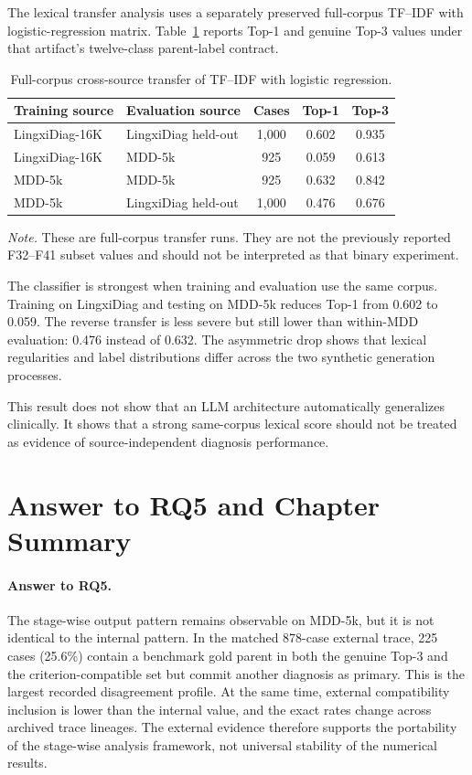The lexical transfer analysis uses a separately preserved full-corpus TF--IDF with logistic-regression matrix. Table~\ref{tab:lexical-transfer-rewrite} reports Top-1 and genuine Top-3 values under that artifact's twelve-class parent-label contract.

\begin{table}[htbp]
\centering
\caption{Full-corpus cross-source transfer of TF--IDF with logistic regression.}
\label{tab:lexical-transfer-rewrite}
\small
\begin{tabularx}{\textwidth}{|>{\raggedright\arraybackslash}p{3.3cm}|>{\raggedright\arraybackslash}p{3.3cm}|c|c|c|}
\hline
\textbf{Training source} & \textbf{Evaluation source} & \textbf{Cases} & \textbf{Top-1} & \textbf{Top-3}\\
\hline
LingxiDiag-16K & LingxiDiag held-out & 1,000 & 0.602 & 0.935\\
\hline
LingxiDiag-16K & MDD-5k & 925 & 0.059 & 0.613\\
\hline
MDD-5k & MDD-5k & 925 & 0.632 & 0.842\\
\hline
MDD-5k & LingxiDiag held-out & 1,000 & 0.476 & 0.676\\
\hline
\end{tabularx}
\parbox{0.96\textwidth}{\footnotesize
\textit{Note.} These are full-corpus transfer runs. They are not the previously reported F32--F41 subset values and should not be interpreted as that binary experiment.}
\end{table}

The classifier is strongest when training and evaluation use the same corpus. Training on LingxiDiag and testing on MDD-5k reduces Top-1 from 0.602 to 0.059. The reverse transfer is less severe but still lower than within-MDD evaluation: 0.476 instead of 0.632. The asymmetric drop shows that lexical regularities and label distributions differ across the two synthetic generation processes.

This result does not show that an LLM architecture automatically generalizes clinically. It shows that a strong same-corpus lexical score should not be treated as evidence of source-independent diagnosis performance.

\section{Answer to RQ5 and Chapter Summary}

\paragraph{Answer to RQ5.}
The stage-wise output pattern remains observable on MDD-5k, but it is not identical to the internal pattern. In the matched 878-case external trace, 225 cases (25.6\%) contain a benchmark gold parent in both the genuine Top-3 and the criterion-compatible set but commit another diagnosis as primary. This is the largest recorded disagreement profile. At the same time, external compatibility inclusion is lower than the internal value, and the exact rates change across archived trace lineages. The external evidence therefore supports the portability of the stage-wise analysis framework, not universal stability of the numerical results.

